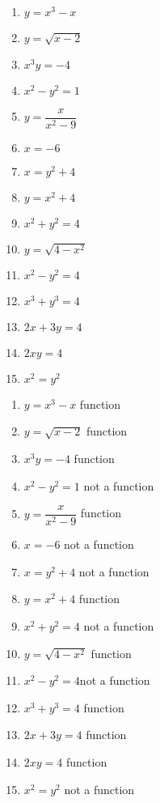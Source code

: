 \begin{enumialphparenastyle}
\begin{multicols}{2}
\begin{ex}
\begin{multicols}{2}
	\begin{enumerate}
		\item $y = x^{3} - x$ 
		\item $y = \sqrt{x - 2}$
		\item $x^{3}y = -4$ 
		\item $x^{2} - y^{2} = 1$
		\item $y = \dfrac{x}{x^{2} - 9}$
		\item $x = -6$
		\item  $x = y^2 + 4$
		\item $y = x^2 + 4$
		\item $x^2 + y^2 = 4$
		\item $y = \sqrt{4-x^2}$
		\item $x^2 - y^2 = 4$
		\item $x^3 + y^3 = 4$
		\item $2x + 3y = 4$
		\item $2xy = 4$
		\item $x^2 = y^2$ 
		\end{enumerate} 
\end{multicols}
\begin{sol}
\begin{multicols}{2}
	\begin{enumerate}
		\item $y = x^{3} - x$  function
		\item $y = \sqrt{x - 2}$ function
		\item $x^{3}y = -4$  function
		\item $x^{2} - y^{2} = 1$ not a function
		\item $y = \dfrac{x}{x^{2} - 9}$ function
		\item $x = -6$ not a function
		\item  $x = y^2 + 4$ not a function
		\item $y = x^2 + 4$ function
		\item $x^2 + y^2 = 4$ not a function
		\item $y = \sqrt{4-x^2}$ function
		\item $x^2 - y^2 = 4$not a function
		\item $x^3 + y^3 = 4$ function
		\item $2x + 3y = 4$ function
		\item $2xy = 4$ function 
		\item $x^2 = y^2$ not a function 
	\end{enumerate} 
\end{multicols} 	
\end{sol}
\end{ex}


\end{multicols}
\end{enumialphparenastyle}
